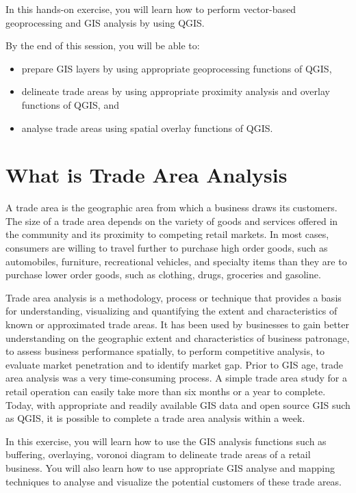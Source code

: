\documentclass[
  letterpaper,
  DIV=11,
  numbers=noendperiod]{scrreprt}
\begin{document}
In this hands-on exercise, you will learn how to perform vector-based
geoprocessing and GIS analysis by using QGIS.

By the end of this session, you will be able to:

\begin{itemize}
\item
  prepare GIS layers by using appropriate geoprocessing functions of
  QGIS,
\item
  delineate trade areas by using appropriate proximity analysis and
  overlay functions of QGIS, and
\item
  analyse trade areas using spatial overlay functions of QGIS.
\end{itemize}

\hypertarget{what-is-trade-area-analysis}{%
\section{What is Trade Area
Analysis}\label{what-is-trade-area-analysis}}

A trade area is the geographic area from which a business draws its
customers. The size of a trade area depends on the variety of goods and
services offered in the community and its proximity to competing retail
markets. In most cases, consumers are willing to travel further to
purchase high order goods, such as automobiles, furniture, recreational
vehicles, and specialty items than they are to purchase lower order
goods, such as clothing, drugs, groceries and gasoline.

Trade area analysis is a methodology, process or technique that provides
a basis for understanding, visualizing and quantifying the extent and
characteristics of known or approximated trade areas. It has been used
by businesses to gain better understanding on the geographic extent and
characteristics of business patronage, to assess business performance
spatially, to perform competitive analysis, to evaluate market
penetration and to identify market gap. Prior to GIS age, trade area
analysis was a very time-consuming process. A simple trade area study
for a retail operation can easily take more than six months or a year to
complete. Today, with appropriate and readily available GIS data and
open source GIS such as QGIS, it is possible to complete a trade area
analysis within a week.

In this exercise, you will learn how to use the GIS analysis functions
such as buffering, overlaying, voronoi diagram to delineate trade areas
of a retail business. You will also learn how to use appropriate GIS
analyse and mapping techniques to analyse and visualize the potential
customers of these trade areas.
\end{document}

